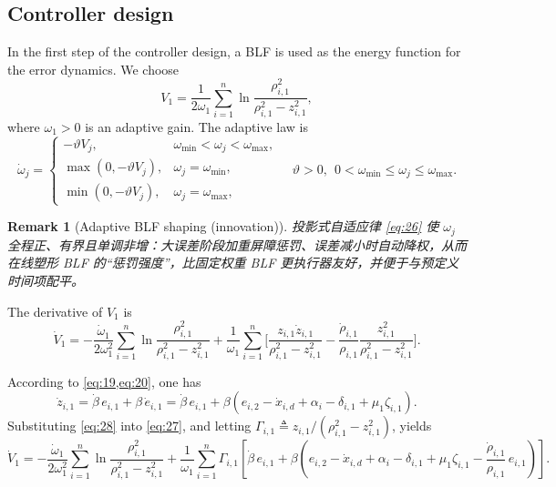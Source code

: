 \documentclass[pdflatex,sn-mathphys-num]{sn-jnl}%
\theoremstyle{thmstyleone}%
\theoremstyle{thmstyletwo}%
\newtheorem{remark}{Remark}%
\theoremstyle{thmstylethree}%
\begin{document}
	\subsection{Controller design}

	In the first step of the controller design, a BLF is used as the energy function for the error dynamics. We choose
	\begin{equation}\label{eq:25}
	  V_1=\frac{1}{2\omega_1}\sum_{i=1}^{n}\ln\frac{\rho_{i,1}^{2}}{\rho_{i,1}^{2}-z_{i,1}^{2}},
	\end{equation}
	where $\omega_1>0$ is an adaptive gain. The adaptive law is
	\begin{equation}\label{eq:26}
	\dot{\omega}_j=
	\begin{cases}
	-\vartheta V_j,& \omega_{\min}<\omega_j<\omega_{\max},\\
	\max(0,-\vartheta V_j),& \omega_j=\omega_{\min},\\
	\min(0,-\vartheta V_j),& \omega_j=\omega_{\max},
	\end{cases}
	\quad \vartheta>0,\ \ 0<\omega_{\min}\le\omega_j\le\omega_{\max}.
	\end{equation}
	
	\begin{remark}[Adaptive BLF shaping (innovation)]
	投影式自适应律 \eqref{eq:26} 使 $\omega_j$ 全程正、有界且单调非增：大误差阶段加重屏障惩罚、误差减小时自动降权，从而在线塑形 BLF 的“惩罚强度”，比固定权重 BLF 更执行器友好，并便于与预定义时间项配平。
	\end{remark}
	
	The derivative of $V_1$ is
	\begin{equation}\label{eq:27}
	\dot{V}_{1}
	=-\frac{\dot{\omega}_{1}}{2 \omega_{1}^{2}}\sum_{i=1}^{n}\ln \frac{\rho_{i,1}^{2}}{\rho_{i,1}^{2}-z_{i,1}^{2}}
	+\frac{1}{\omega_{1}} \sum_{i=1}^{n} \Bigg[ \frac{z_{i,1} \dot{z}_{i,1}}{\rho_{i,1}^{2} - z_{i,1}^{2}}
	-\frac{\dot{\rho}_{i,1}}{\rho_{i,1}} \frac{z_{i,1}^{2}}{\rho_{i,1}^{2} - z_{i,1}^{2}} \Bigg].
	\end{equation}
	
	According to \cref{eq:19,eq:20}, one has
	\begin{equation}\label{eq:28}
	\dot{z}_{i,1}=\dot{\beta}\,e_{i,1}+\beta\,\dot e_{i,1}
	=\dot{\beta}\,e_{i,1}+\beta\!\left(e_{i,2}-\dot x_{i,d}+\alpha_{i}-\delta_{i,1}+\mu_1 \zeta_{i,1}\right).
	\end{equation}
	Substituting \eqref{eq:28} into \eqref{eq:27}, and letting $\Gamma_{i,1}\triangleq z_{i,1}/(\rho_{i,1}^{2}-z_{i,1}^{2})$, yields
	\begin{equation}\label{eq:29}
	\dot{V}_{1}=
	-\frac{\dot{\omega}_{1}}{2 \omega_{1}^{2}}\sum_{i=1}^{n}\ln\frac{\rho_{i,1}^{2}}{\rho_{i,1}^{2}-z_{i,1}^{2}}
	+\frac{1}{\omega_{1}}\sum_{i=1}^{n}\Gamma_{i,1}\!\left[
	\dot{\beta}\, e_{i,1}
	+\beta \!\left(e_{i,2}-\dot x_{i,d}+\alpha_{i}-\delta_{i,1}+\mu_1 \zeta_{i,1}
	-\frac{\dot{\rho}_{i,1}}{\rho_{i,1}}\,e_{i,1}\right)\right].
	\end{equation}
	
\end{document}
